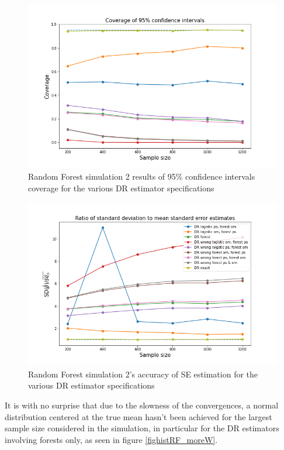 \documentclass[12pt,twoside]{article}
\begin{document}
\begin{figure}[h!]
    \centering
    \includegraphics[width = 0.9\columnwidth]{figures/CIRF_moreW.png}
    \caption{Random Forest simulation 2 results of 95\% confidence intervals coverage for the various DR estimator specifications}
    \label{figCIRF_moreW}
\end{figure}

\begin{figure}[h!]
    \centering
    \includegraphics[width = 0.9\columnwidth]{figures/SERF_moreW.png}
    \caption{Random Forest simulation 2's accuracy of \citet{lunceford_davidian} SE estimation for the various DR estimator specifications}
    \label{figSERF_moreW}
\end{figure}

It is with no surprise that due to the slowness of the convergences, a normal distribution centered at the true mean hasn't been achieved for the largest sample size considered in the simulation, in particular for the DR estimators involving forests only, as seen in figure \ref{fighistRF_moreW}. \\
\end{document}
